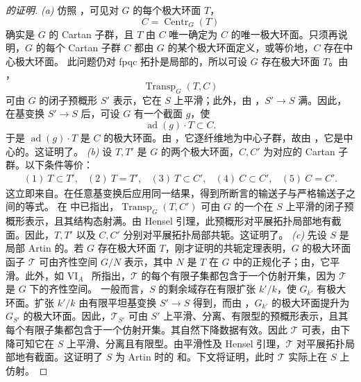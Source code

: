 \begin{proof}[ 的证明]
\emph{(a)} 仿照 ，可见对 \(G\) 的每个极大环面 \(T\)，
\[
  C=\operatorname{Centr}_G(T)
\]
确实是 \(G\) 的 Cartan 子群，且 \(T\) 由 \(C\) 唯一确定为 \(C\) 的唯一极大环面。只须再说明，\(G\) 的每个 Cartan 子群 \(C\) 都由 \(G\) 的某个极大环面定义，或等价地，\(C\) 存在中心极大环面。
此问题仍对 fpqc 拓扑是局部的，所以可设 \(G\) 存在极大环面 \(T\)。由 ，
\[
  \operatorname{Transp}_G(T,C)
\]
可由 \(G\) 的闭子预概形 \(S'\) 表示，它在 \(S\) 上平滑；此外，由 ，\(S'\to S\) 满。因此，在基变换 \(S'\to S\) 后，可设 \(G\) 有一个截面 \(g\)，使
\[
  \operatorname{ad}(g)\cdot T\subset C.
\]
于是 \(\operatorname{ad}(g)\cdot T\) 是 \(C\) 的极大环面。由 ，它逐纤维地为中心子群，故由 ，它是中心的。这证明了\textup{}。
\emph{(b)} 设 \(T,T'\) 是 \(G\) 的两个极大环面，\(C,C'\) 为对应的 Cartan 子群。以下条件等价：
\[
\begin{array}{ccccc}
(1)\ T\subset T',&
(2)\ T=T',&
(3)\ T\subset C',&
(4)\ C\subset C',&
(5)\ C=C'.
\end{array}
\]
这立即来自\textup{}。在任意基变换后应用同一结果，得到所断言的输送子与严格输送子之间的等式。
在\textup{} 中已指出，\(\operatorname{Transp}_G(T,C')\) 可由 \(G\) 的一个在 \(S\) 上平滑的闭子预概形表示，且其结构态射满。由 Hensel 引理，此预概形对平展拓扑局部地有截面。因此，\(T,T'\) 以及 \(C,C'\) 分别对平展拓扑局部共轭。这证明了\textup{}。
\emph{(c)} 先设 \(S\) 是局部 Artin 的。若 \(G\) 存在极大环面 \(T\)，刚才证明的共轭定理表明，\(G\) 的极大环面函子 \(\mathcal T\) 可由齐性空间 \(G/N\) 表示，其中 \(N\) 是 \(T\) 在 \(G\) 中的正规化子；由\textup{}，它平滑。此外，如 VI\(_A\)~ 所指出，\(\mathcal T\) 的每个有限子集都包含于一个仿射开集，因为 \(\mathcal T\) 是 \(G\) 下的齐性空间。
一般而言，\(S\) 的剩余域存在有限扩张 \(k'/k\)，使 \(G_{k'}\) 有极大环面。扩张 \(k'/k\) 由有限平坦基变换 \(S'\to S\) 得到，而由 ，\(G_{k'}\) 的极大环面提升为 \(G_{S'}\) 的极大环面。因此，\(\mathcal T_{S'}\) 可由 \(S'\) 上平滑、分离、有限型的预概形表示，且其每个有限子集都包含于一个仿射开集。其自然下降数据有效。因此 \(\mathcal T\) 可表，由下降可知它在 \(S\) 上平滑、分离且有限型。由平滑性及 Hensel 引理，\(\mathcal T\) 对平展拓扑局部地有截面。这证明了 \(S\) 为 Artin 时的\textup{} 和\textup{}。下文将证明，此时 \(\mathcal T\) 实际上在 \(S\) 上仿射。

\end{proof}
